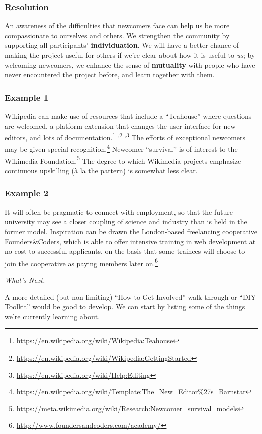 \subsubsection*{Resolution}
An awareness of the difficulties that newcomers face can
help us be more compassionate to ourselves and others.  We strengthen the community
by supporting all participants' \textbf{individuation}.  We will have a better chance of making
the project useful for others if we're clear about how it is useful to \emph{us}; by welcoming newcomers, we enhance the sense of \textbf{mutuality} with people who have never encountered the project before, and learn together with them.

\subsubsection*{Example 1} Wikipedia  can make use of resources that
include a ``Teahouse'' where questions are welcomed, a platform extension that changes the user
interface for new editors, and lots of documentation.\footnote{\url{https://en.wikipedia.org/wiki/Wikipedia:Teahouse}}%
\textsuperscript{,}\footnote{\url{https://en.wikipedia.org/wiki/Wikipedia:GettingStarted}}%
\textsuperscript{,}\footnote{\url{https://en.wikipedia.org/wiki/Help:Editing}}
The efforts of exceptional newcomers may be given special
recognition.\footnote{\url{https://en.wikipedia.org/wiki/Template:The_New_Editor\%27s_Barnstar}}
Newcomer ``survival'' is of interest to the Wikimedia
Foundation.\footnote{\url{https://meta.wikimedia.org/wiki/Research:Newcomer_survival_models}}
The degree to which Wikimedia projects emphasize continuous upskilling
(\`a la the  pattern) is somewhat less clear.

\subsubsection*{Example 2} It will often be pragmatic to connect
 with employment, so that the future
university may see a closer coupling of science and industry than is
held in the former model.  Inspiration can be drawn the London-based freelancing cooperative Founders\&Coders, which is
able to offer intensive training in web development at no cost to
successful applicants, on the basis that some trainees will choose to
join the cooperative as paying members later
on.\footnote{\url{http://www.foundersandcoders.com/academy/}}


\begin{framed}
\noindent 
\emph{What's Next.}
\begin{collectinmacro}{\NewcomerWN}{}{}
A more detailed (but non-limiting) ``How to Get Involved'' walk-through or ``DIY Toolkit'' would be good to develop. We can start by listing some of the things we're currently learning about.
\end{collectinmacro}
\NewcomerWN
\end{framed}
